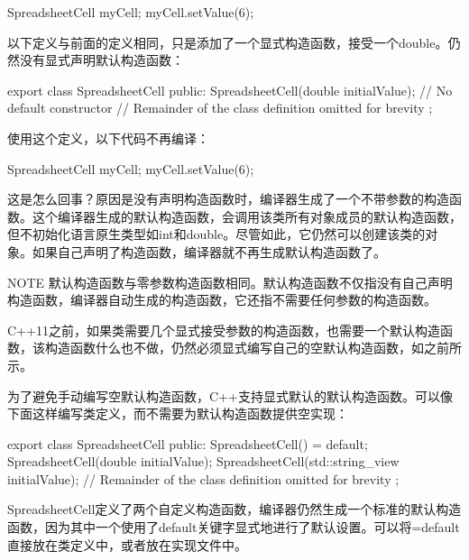 \begin{cpp}
SpreadsheetCell myCell;
myCell.setValue(6);
\end{cpp}

以下定义与前面的定义相同，只是添加了一个显式构造函数，接受一个double。仍然没有显式声明默认构造函数：

\begin{cpp}
export class SpreadsheetCell
{
    public:
        SpreadsheetCell(double initialValue); // No default constructor
        // Remainder of the class definition omitted for brevity
};
\end{cpp}

使用这个定义，以下代码不再编译：

\begin{cpp}
SpreadsheetCell myCell;
myCell.setValue(6);
\end{cpp}

这是怎么回事？原因是没有声明构造函数时，编译器生成了一个不带参数的构造函数。这个编译器生成的默认构造函数，会调用该类所有对象成员的默认构造函数，但不初始化语言原生类型如int和double。尽管如此，它仍然可以创建该类的对象。如果自己声明了构造函数，编译器就不再生成默认构造函数了。

\begin{myNotic}{NOTE}
默认构造函数与零参数构造函数相同。默认构造函数不仅指没有自己声明构造函数，编译器自动生成的构造函数，它还指不需要任何参数的构造函数。
\end{myNotic}


C++11之前，如果类需要几个显式接受参数的构造函数，也需要一个默认构造函数，该构造函数什么也不做，仍然必须显式编写自己的空默认构造函数，如之前所示。

为了避免手动编写空默认构造函数，C++支持显式默认的默认构造函数。可以像下面这样编写类定义，而不需要为默认构造函数提供空实现：

\begin{cpp}
export class SpreadsheetCell
{
    public:
        SpreadsheetCell() = default;
        SpreadsheetCell(double initialValue);
        SpreadsheetCell(std::string_view initialValue);
        // Remainder of the class definition omitted for brevity
};
\end{cpp}

SpreadsheetCell定义了两个自定义构造函数，编译器仍然生成一个标准的默认构造函数，因为其中一个使用了default关键字显式地进行了默认设置。可以将=default直接放在类定义中，或者放在实现文件中。


